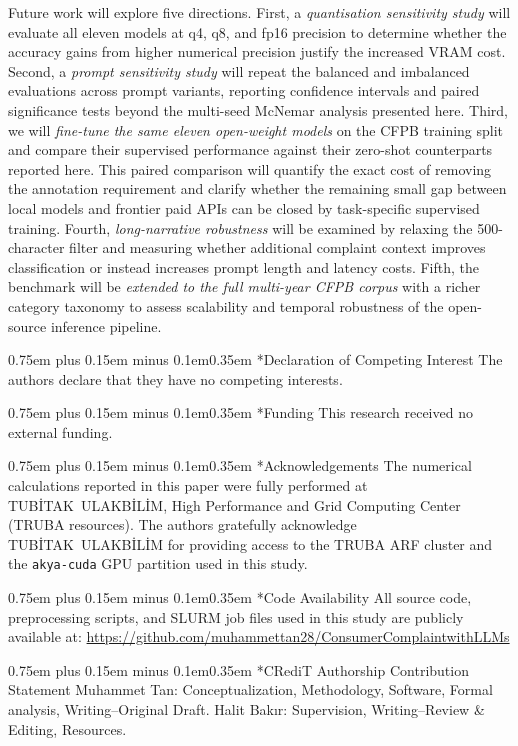 \documentclass[10pt,a4paper,twocolumn]{article}
\makeatletter
\renewcommand\section{\@startsection{section}{1}{0pt}%
  {0.75em plus 0.15em minus 0.1em}{0.35em}%
  {\normalfont\normalsize\itshape}}
\makeatother
\begin{document}
Future work will explore five directions.
First, a \emph{quantisation sensitivity study} will evaluate all eleven
models at q4, q8, and fp16 precision to determine whether the accuracy
gains from higher numerical precision justify the increased VRAM cost.
Second, a \emph{prompt sensitivity study} will repeat the
balanced and imbalanced evaluations across prompt variants,
reporting confidence intervals and paired significance tests
beyond the multi-seed McNemar analysis presented here.
Third, we will \emph{fine-tune the same eleven open-weight models} on
the CFPB training split and compare their supervised performance against
their zero-shot counterparts reported here. This paired comparison will
quantify the exact cost of removing the annotation requirement and
clarify whether the remaining small gap between local models and
frontier paid APIs can be closed by task-specific supervised training.
Fourth, \emph{long-narrative robustness} will be examined by relaxing
the 500-character filter and measuring whether additional complaint
context improves classification or instead increases prompt length and
latency costs.
Fifth, the benchmark will be \emph{extended to the full multi-year
CFPB corpus} with a richer category taxonomy to assess scalability
and temporal robustness of the open-source inference pipeline.


\FloatBarrier

\section*{Declaration of Competing Interest}
The authors declare that they have no competing interests.

\section*{Funding}
This research received no external funding.

\section*{Acknowledgements}
The numerical calculations reported in this paper were fully performed
at \mbox{TUBİTAK ULAKBİLİM}, High Performance and Grid Computing Center
(TRUBA resources). The authors gratefully acknowledge \mbox{TUBİTAK ULAKBİLİM}
for providing access to the TRUBA ARF cluster and the \texttt{akya-cuda}
GPU partition used in this study.

\section*{Code Availability}
All source code, preprocessing scripts, and SLURM job files used in
this study are publicly available at:
\url{https://github.com/muhammettan28/ConsumerComplaintwithLLMs}

\section*{CRediT Authorship Contribution Statement}
Muhammet Tan: Conceptualization, Methodology, Software, Formal analysis,
Writing--Original Draft. Halit Bakır: Supervision, Writing--Review \&
Editing, Resources.



\end{document}
